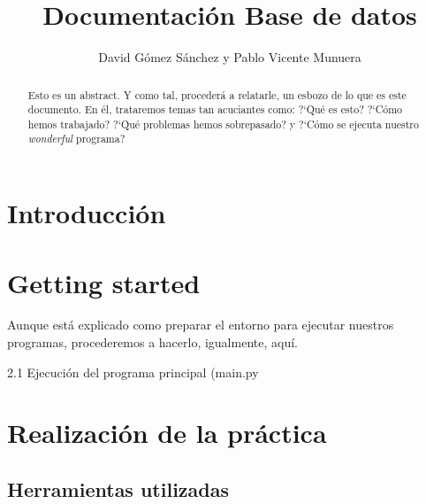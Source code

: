 \documentclass[11pt]{article} %
\title{Documentaci\'on Base de datos}
\author{David G\'omez S\'anchez y Pablo Vicente Munuera}
\date{} %
\begin{document}
\maketitle

\begin{abstract}

Esto es un abstract. Y como tal, proceder\'a a relatarle, un esbozo de lo que es este documento. En él, trataremos temas tan acuciantes como: ?`Qu\'e es esto? ?`C\'omo hemos trabajado? ?`Qu\'e problemas hemos sobrepasado? y ?`C\'omo se ejecuta nuestro \emph{wonderful} programa?

\end{abstract}

\section{Introducci\'on}



\section{Getting started}

Aunque est\'a explicado como preparar el entorno para ejecutar nuestros programas, procederemos a hacerlo, igualmente, aqu\'i.

2.1 Ejecución del programa principal (main.py

\section{Realizaci\'on de la pr\'actica}

\subsection{Herramientas utilizadas}
\end{document}
